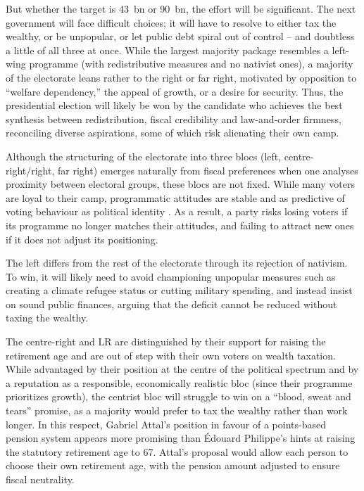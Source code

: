 \documentclass[12pt,english]{article}
\newcommand{\blue}[1]{\textcolor{blue!60!black}{#1}}
\begin{document}
But whether the target is 43~bn or 90~bn, the effort will be significant. \blue{The next government will face difficult choices; it will have to resolve to either tax the wealthy, or be unpopular, or let public debt spiral out of control -- and doubtless a little of all three at once.}
While the largest majority package resembles a left-wing programme (with redistributive measures and no nativist ones), a majority of the electorate leans rather to the right or far right, motivated by opposition to ``welfare dependency,'' the appeal of growth, or a desire for security.
Thus, \blue{the presidential election will likely be won by the candidate who achieves the best synthesis between redistribution, fiscal credibility and law-and-order firmness}, reconciling diverse aspirations, some of which risk alienating their own camp.

Although \blue{the structuring of the electorate into three blocs (left, centre-right/right, far right) emerges naturally from fiscal preferences} when one analyses proximity between electoral groups, these blocs are not fixed. While many voters are loyal to their camp, programmatic attitudes are stable and as predictive of voting behaviour as political identity \citep{ansolabehere_strength_2008}. As a result, a party risks losing voters if its programme no longer matches their attitudes, and failing to attract new ones if it does not adjust its positioning.

\blue{The left differs from the rest of the electorate through its rejection of nativism. To win, it will likely need to} avoid championing unpopular measures such as creating a climate refugee status or cutting military spending, and instead \blue{insist on sound public finances, arguing that the deficit cannot be reduced without taxing the wealthy}.

\blue{The centre-right and LR are distinguished by their support for raising the retirement age and are out of step with their own voters on wealth taxation}. While advantaged by their position at the centre of the political spectrum and by a reputation as a responsible, economically realistic bloc (since their programme prioritizes growth), the centrist bloc will struggle to win on a ``blood, sweat and tears'' promise, as a majority would prefer to tax the wealthy rather than work longer. In this respect, Gabriel Attal's position in favour of a points-based pension system appears more promising than Édouard Philippe's hints at raising the statutory retirement age to 67. Attal's proposal would allow each person to choose their own retirement age, with the pension amount adjusted to ensure fiscal neutrality.
\end{document}
